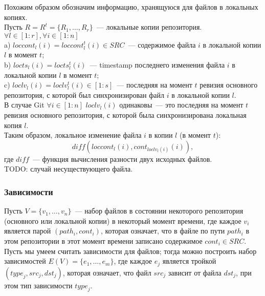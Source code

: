 Похожим образом обозначим информацию, хранящуюся для файлов в локальных копиях.\\
Пусть $R = R^t = \{R_1, \dots, R_r\}$~--- локальные копии репозитория.\\
$\forall l \in [1:r], \forall i \in [1:n]$\\
\indent a) $loccont_l(i) = loccont_l^t(i) \in SRC$~--- содержимое файла $i$ в локальной копии $l$ в момент $t$;\\
\indent b) $locts_l(i) = locts_l^t(i)$~--- timestamp последнего изменения файла $i$ в локальной копии $l$ в момент $t$;\\
\indent c) $loclv_l(i) = loclv_l^t(i) \in {[1:s]}$~--- последняя на момент $t$ ревизия основного репозитория, с которой был синхронизирован файл $i$ в локальной копии $l$.\\
В случае Git $\forall i \in [1:n]$ $loclv_l(i)$ одинаковы~--- это последняя на момент $t$ ревизия основного репозитория, с которой была синхронизирована локальная копия $l$.\\

Таким образом, локальное изменение файла $i$ в копии $l$ (в момент $t$): $$\mathit{diff}(loccont_l(i), cont_{loclv_l(i)}(i)),$$ где $\mathit{diff}$~--- функция вычисления разности двух исходных файлов.\\
TODO: случай несуществующего файла.

\subsubsection{Зависимости}

Пусть $V = \{v_1, \dots, v_n\}$~--- набор файлов в состоянии некоторого репозитория (основного или локальной копии) в некоторый момент времени, где каждое $v_i$ является парой $(path_i, cont_i)$, которая означает, что в файле по пути $path_i$ в этом репозитории в этот момент времени записано содержимое $cont_i \in SRC$. Пусть мы умеем считать зависимости для файлов; тогда можно построить набор зависимостей $E(V) = \{e_1, \dots, e_m\}$, где каждое $e_j$ является тройкой $(\textit{type}_j, \textit{src}_j, \textit{dst}_j)$, которая означает, что файл $\textit{src}_j$ зависит от файла $\textit{dst}_j$, при этом тип зависимости $\textit{type}_j$.\\

